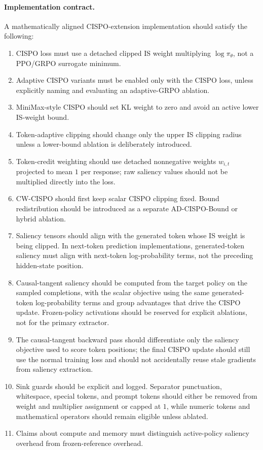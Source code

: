 \documentclass[11pt]{article}
\begin{document}
\paragraph{Implementation contract.}
A mathematically aligned CISPO-extension implementation should satisfy the following:
\begin{enumerate}[leftmargin=*]
  \item CISPO loss must use a detached clipped IS weight multiplying
  $\log\pi_\theta$, not a PPO/GRPO surrogate minimum.
  \item Adaptive CISPO variants must be enabled only with the CISPO loss,
  unless explicitly naming and evaluating an adaptive-GRPO ablation.
  \item MiniMax-style CISPO should set KL weight to zero and avoid an active
  lower IS-weight bound.
  \item Token-adaptive clipping should change only the upper IS clipping radius
  unless a lower-bound ablation is deliberately introduced.
  \item Token-credit weighting should use detached nonnegative weights
  $w_{i,t}$ projected to mean $1$ per response; raw saliency values should not
  be multiplied directly into the loss.
  \item CW-CISPO should first keep scalar CISPO clipping fixed. Bound
  redistribution should be introduced as a separate AD-CISPO-Bound or hybrid
  ablation.
  \item Saliency tensors should align with the generated token whose IS weight
  is being clipped. In next-token prediction implementations, generated-token
  saliency must align with next-token log-probability terms, not the preceding
  hidden-state position.
  \item Causal-tangent saliency should be computed from the target policy on the
  sampled completions, with the scalar objective using the same generated-token
  log-probability terms and group advantages that drive the CISPO update.
  Frozen-policy activations should be reserved for explicit ablations, not for
  the primary extractor.
  \item The causal-tangent backward pass should differentiate only the saliency
  objective used to score token positions; the final CISPO update should still
  use the normal training loss and should not accidentally reuse stale gradients
  from saliency extraction.
  \item Sink guards should be explicit and logged. Separator punctuation,
  whitespace, special tokens, and prompt tokens should either be removed from
  weight and multiplier assignment or capped at $1$, while numeric tokens and
  mathematical operators should remain eligible unless ablated.
  \item Claims about compute and memory must distinguish active-policy saliency
  overhead from frozen-reference overhead.
\end{enumerate}
\end{document}
